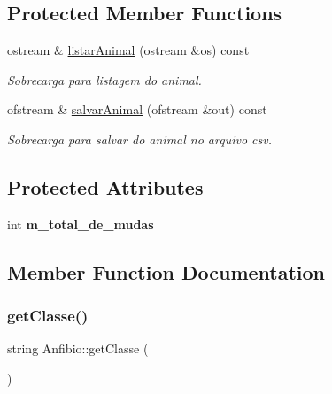 \subsection*{Protected Member Functions}
\begin{DoxyCompactItemize}
\item 
\mbox{\label{class_anfibio_ab5d569558f26b3a1b6d3dd37a89bfcb3}} 
ostream \& \mbox{\hyperlink{class_anfibio_ab5d569558f26b3a1b6d3dd37a89bfcb3}{listar\+Animal}} (ostream \&os) const
\begin{DoxyCompactList}\small\item\em Sobrecarga para listagem do animal. \end{DoxyCompactList}\item 
\mbox{\label{class_anfibio_aaa8a5af877fa742b3fcf276fc5f0736a}} 
ofstream \& \mbox{\hyperlink{class_anfibio_aaa8a5af877fa742b3fcf276fc5f0736a}{salvar\+Animal}} (ofstream \&out) const
\begin{DoxyCompactList}\small\item\em Sobrecarga para salvar do animal no arquivo csv. \end{DoxyCompactList}\end{DoxyCompactItemize}
\subsection*{Protected Attributes}
\begin{DoxyCompactItemize}
\item 
\mbox{\label{class_anfibio_a994200134b0d314e3db0ac5c781bb7e7}} 
int {\bfseries m\+\_\+total\+\_\+de\+\_\+mudas}
\end{DoxyCompactItemize}


\subsection{Member Function Documentation}
\mbox{\label{class_anfibio_a9b792c2cf3a073a306c6d20f89c6c614}} 
\subsubsection{\texorpdfstring{getClasse()}{getClasse()}}
{\footnotesize\ttfamily string Anfibio\+::get\+Classe (\begin{DoxyParamCaption}{ }\end{DoxyParamCaption})\hspace{0.3cm}{\ttfamily [virtual]}}



